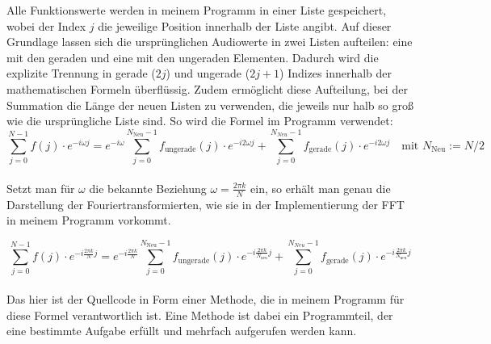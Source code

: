 \documentclass[a4paper,12pt]{article}
\theoremstyle{definition}
\theoremstyle{remark}
\begin{document}
Alle Funktionswerte werden in meinem Programm in einer Liste gespeichert, wobei der Index $j$ die jeweilige Position innerhalb 
der Liste angibt. Auf dieser Grundlage lassen sich die ursprünglichen Audiowerte in zwei Listen aufteilen: eine mit den geraden 
und eine mit den ungeraden Elementen. Dadurch wird die explizite Trennung in gerade ($2j$) und ungerade ($2j+1$) Indizes innerhalb 
der mathematischen Formeln überflüssig. Zudem ermöglicht diese Aufteilung, bei der Summation die Länge der neuen Listen zu 
verwenden, die jeweils nur halb so groß wie die ursprüngliche Liste sind. So wird die Formel im Programm verwendet: 
\[
\sum_{j=0}^{N-1}{f(j)\cdot e^{-i\omega j}} = e^{-i\omega}\sum_{j=0}^{N_{\text{Neu}}-1}{f_{\text{ungerade}}(j)\cdot e^{-i 2\omega j}} + \sum_{j=0}^{N_{Neu}-1}{f_{\text{gerade}}(j)\cdot e^{-i 2\omega j}} \quad \text{mit $N_{\text{Neu}} := N/2$ }
\]
\\
Setzt man für $\omega$ die bekannte Beziehung $\omega=\tfrac{2\pi k}{N}$ ein, so erhält man genau die Darstellung der 
Fouriertransformierten, wie sie in der Implementierung der FFT in meinem Programm vorkommt.

\[
\sum_{j=0}^{N-1}{f(j)\cdot e^{-i \frac{2\pi k}{N} j}} = e^{-i \frac{2\pi k}{N}} \sum_{j=0}^{N_{\text{Neu}}-1}{f_{\text{ungerade}}(j)\cdot e^{-i \frac{2\pi k}{N_{\text{neu}}} j}} + \sum_{j=0}^{N_{Neu}-1}{f_{\text{gerade}}(j)\cdot e^{-i \frac{2\pi k}{N_{\text{neu}}} j}}
\]
\\
Das hier ist der Quellcode in Form einer Methode, die in meinem Programm für diese Formel verantwortlich ist. Eine Methode ist 
dabei ein Programmteil, der eine bestimmte Aufgabe erfüllt und mehrfach aufgerufen werden kann.
\end{document}
